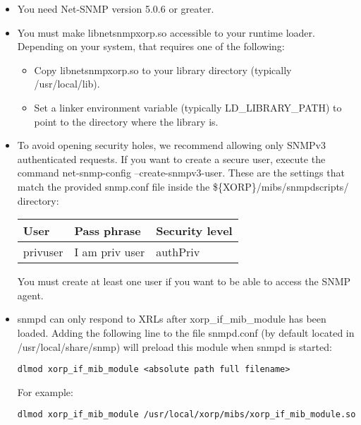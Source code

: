 \begin{itemize}

  \item You need Net-SNMP version 5.0.6 or greater.

  \item You must make {\stt libnetsnmpxorp.so} accessible to your runtime
  loader. Depending on your system, that requires one of the following:

  \begin{itemize}

    \item Copy {\stt libnetsnmpxorp.so} to your library directory (typically
    {\stt /usr/local/lib}).

    \item Set a linker environment variable (typically
    {\stt LD\_LIBRARY\_PATH}) to point to the directory where the library is.

  \end{itemize}

  \item To avoid opening security holes, we recommend allowing only SNMPv3
  authenticated requests.  If you want to create a secure user, execute the
  command {\stt net-snmp-config --create-snmpv3-user}.  These are the settings
  that  match the provided {\stt snmp.conf} file inside the
  {\stt \$\{XORP\}/mibs/snmpdscripts/} directory:

\begin{table*}[h]
\begin{center}
\begin{tabular}{|l|l|l|} \hline
User & Pass phrase & Security level \\
\hline\hline
privuser &  I am priv user & authPriv \\ \hline
\end{tabular}
\end{center}
\end{table*}

  You must create at least one user if you want to be able to access the SNMP 
  agent.

  \item {\stt snmpd} can only respond to XRLs after
  {\stt xorp\_if\_mib\_module} has been loaded.
  Adding the following line to the file {\stt snmpd.conf} (by default located
  in {\stt /usr/local/share/snmp}) will preload this module when {\stt snmpd}
  is started:

  {\tt dlmod xorp\_if\_mib\_module <absolute path full filename>}

  For example:

  {\tt dlmod xorp\_if\_mib\_module /usr/local/xorp/mibs/xorp\_if\_mib\_module.so}
\end{itemize}

